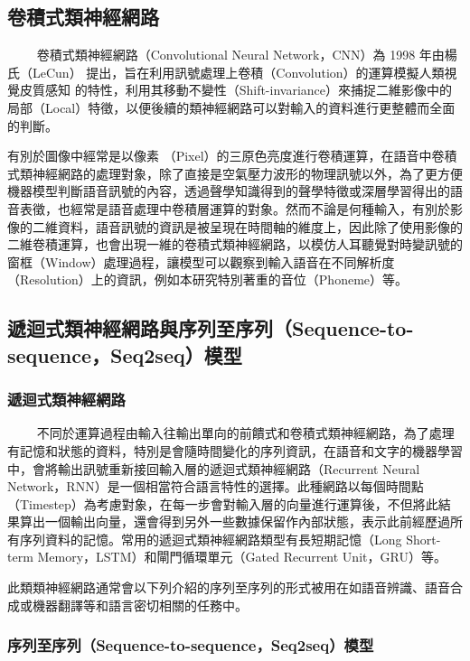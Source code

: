 \subsection{卷積式類神經網路}

　　
卷積式類神經網路（Convolutional Neural Network，CNN）為 1998 年由楊氏（LeCun） \cite{lecun_gradient-based_1998} 提出，旨在利用訊號處理上卷積（Convolution）的運算模擬人類視覺皮質感知 \cite{hubel_receptive_1959} 的特性，利用其移動不變性（Shift-invariance）來捕捉二維影像中的局部（Local）特徵，以便後續的類神經網路可以對輸入的資料進行更整體而全面的判斷。

有別於圖像中經常是以像素 （Pixel）的三原色亮度進行卷積運算，在語音中卷積式類神經網路的處理對象，除了直接是空氣壓力波形的物理訊號以外，為了更方便機器模型判斷語音訊號的內容，透過聲學知識得到的聲學特徵或深層學習得出的語音表徵，也經常是語音處理中卷積層運算的對象。然而不論是何種輸入，有別於影像的二維資料，語音訊號的資訊是被呈現在時間軸的維度上，因此除了使用影像的二維卷積運算，也會出現一維的卷積式類神經網路，以模仿人耳聽覺對時變訊號的窗框（Window）處理過程，讓模型可以觀察到輸入語音在不同解析度（Resolution）上的資訊，例如本研究特別著重的音位（Phoneme）等。


\subsection{遞迴式類神經網路與序列至序列（Sequence-to-sequence，Seq2seq）模型}

\subsubsection{遞迴式類神經網路}

　　
不同於運算過程由輸入往輸出單向的前饋式和卷積式類神經網路，為了處理有記憶和狀態的資料，特別是會隨時間變化的序列資訊，在語音和文字的機器學習中，會將輸出訊號重新接回輸入層的遞迴式類神經網路（Recurrent Neural Network，RNN）是一個相當符合語言特性的選擇。此種網路以每個時間點（Timestep）為考慮對象，在每一步會對輸入層的向量進行運算後，不但將此結果算出一個輸出向量，還會得到另外一些數據保留作內部狀態，表示此前經歷過所有序列資料的記憶。常用的遞迴式類神經網路類型有長短期記憶（Long Short-term Memory，LSTM）和閘門循環單元（Gated Recurrent Unit，GRU）等。
  
此類類神經網路通常會以下列介紹的序列至序列的形式被用在如語音辨識、語音合成或機器翻譯等和語言密切相關的任務中。

\subsubsection{序列至序列（Sequence-to-sequence，Seq2seq）模型}

